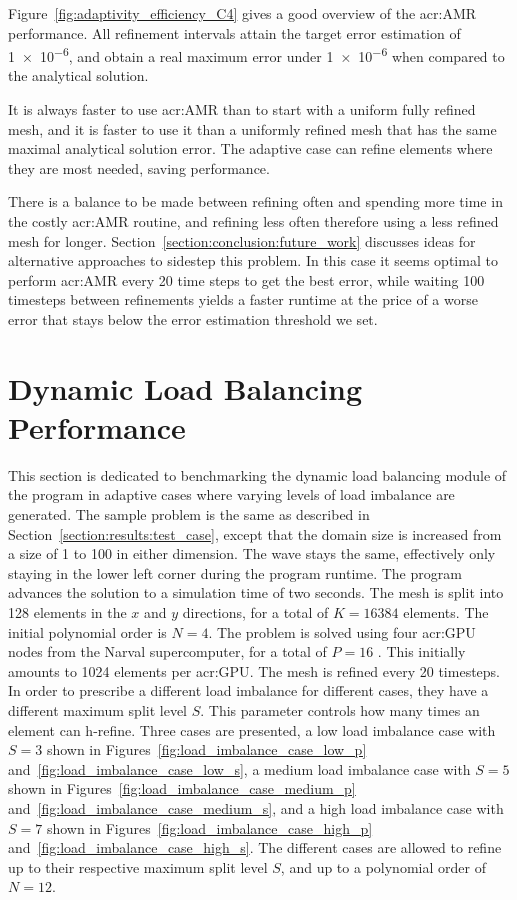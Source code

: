 Figure~\ref{fig:adaptivity_efficiency_C4} gives a good overview of the \acrshort{acr:AMR}
performance. All refinement intervals attain the target error estimation of \num{1e-6}, and obtain a
real maximum error under \num{1e-6} when compared to the analytical solution. 

It is always faster to use \acrshort{acr:AMR} than to start with a uniform fully refined mesh, and
it is faster to use it than a uniformly refined mesh that has the same maximal analytical solution
error. The adaptive case can refine elements where they are most needed, saving performance.

There is a balance to be made between refining often and spending more time in the costly
\acrshort{acr:AMR} routine, and refining less often therefore using a less refined mesh for longer.
Section~\ref{section:conclusion:future_work} discusses ideas for alternative approaches to sidestep
this problem. In this case it seems optimal to perform \acrshort{acr:AMR} every 20 time steps to get
the best error, while waiting 100 timesteps between refinements yields a faster runtime at the price
of a worse error that stays below the error estimation threshold we set.

\section{Dynamic Load Balancing Performance}\label{section:results:load_balancing_performance}

This section is dedicated to benchmarking the dynamic load balancing module of the program in
adaptive cases where varying levels of load imbalance are generated. The sample problem is the same
as described in Section~\ref{section:results:test_case}, except that the domain size is increased
from a size of 1 to 100 in either dimension. The wave stays the same, effectively only staying in
the lower left corner during the program runtime. The program advances the solution to a simulation
time of two seconds. The mesh is split into 128 elements in the \(x\) and \(y\) directions, for a
total of \(K = 16384\) elements. The initial polynomial order is \(N = 4\). The problem is solved
using four \acrshort{acr:GPU} nodes from the Narval supercomputer, for a total of \(P = 16\)
. This initially amounts to 1024 elements per \acrshort{acr:GPU}. The mesh is
refined every 20 timesteps. In order to prescribe a different load imbalance for different cases,
they have a different maximum split level \(S\). This parameter controls how many times an element
can h-refine. Three cases are presented, a low load imbalance case with \(S = 3\) shown in
Figures~\ref{fig:load_imbalance_case_low_p} and~\ref{fig:load_imbalance_case_low_s}, a medium load
imbalance case with \(S = 5\) shown in Figures~\ref{fig:load_imbalance_case_medium_p}
and~\ref{fig:load_imbalance_case_medium_s}, and a high load imbalance case with \(S = 7\) shown in
Figures~\ref{fig:load_imbalance_case_high_p} and~\ref{fig:load_imbalance_case_high_s}. The different
cases are allowed to refine up to their respective maximum split level \(S\), and up to a polynomial
order of \(N = 12\). 

